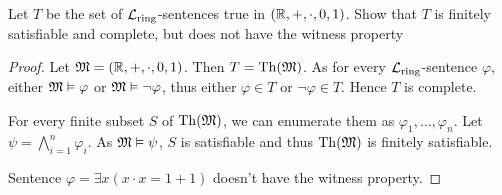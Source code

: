 \documentclass[11pt]{article}
\begin{document}
\begin{exercise}
Let \(T\) be the set of \(\mathcal{L}_{\text{ring}}\)-sentences true in \((\mathbb{R},+,\cdot,0,1)\). Show that \(T\) is
finitely satisfiable and complete, but does not have the witness property
\end{exercise}

\begin{proof}
Let \(\mathfrak{M}=(\mathbb{R},+,\cdot,0,1)\). Then \(T=\operatorname{Th}(\mathfrak{M})\). As for every \(\mathcal{L}_{\text{ring}}\)-sentence \(\varphi\),
either \(\mathfrak{M}\vDash\varphi\) or \(\mathfrak{M}\vDash\neg\varphi\), thus either \(\varphi\in T\) or \(\neg\varphi\in T\). Hence \(T\) is complete.

For every finite subset \(S\) of \(\operatorname{Th}(\mathfrak{M})\), we can enumerate them as \(\varphi_1,\dots,\varphi_n\). Let \(\psi=\bigwedge_{i=1}^n\varphi_i\).
As \(\mathfrak{M}\vDash\psi\), \(S\) is satisfiable and thus \(\operatorname{Th}(\mathfrak{M})\) is finitely satisfiable.

Sentence \(\varphi=\exists x(x\cdot x=1+1)\) doesn't have the witness property.
\end{proof}
\end{document}
